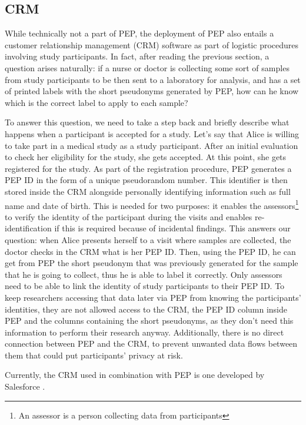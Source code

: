 \documentclass{report}
\begin{document}
\subsection{CRM}\label{CRM}
While technically not a part of PEP, the deployment of PEP also entails a customer relationship management (CRM) software as part of logistic procedures involving study participants. In 
fact, after reading the previous section, a question arises naturally: if a nurse or doctor is collecting some sort of samples from study participants to be then sent to a laboratory 
for analysis, and has a set of printed labels with the short pseudonyms generated by PEP, how can he know which is the correct label to apply to each sample? \par
To answer this question, we need to take a step back and briefly describe what happens when a participant is accepted for a study. Let's say that Alice is willing to take part in a
medical study as a study participant. After an initial evaluation to check her eligibility for the study, she gets accepted. At this point, she gets registered for the study. As
part of the registration procedure, PEP generates a PEP ID in the form of a unique pseudorandom number. This identifier is then stored inside the CRM alongside personally
identifying information such as full name and date of birth. This is needed for two purposes: it enables the assessors\footnote{An assessor is a person collecting data from
participants} to verify the identity of the participant during the visits and enables re-identification if this is required because of incidental findings. This answers our
question: when Alice presents herself to a visit where samples are collected, the doctor checks in the CRM what is her PEP ID. Then, using the PEP ID, he can get from PEP the short
pseudonym that was previously generated for the sample that he is going to collect, thus he is able to label it correctly. Only assessors need to be able to link the identity of
study participants to their PEP ID. To keep researchers accessing that data later via PEP from knowing the participants' identities, they are not allowed access to the CRM, the
PEP ID column inside PEP and the columns containing the short pseudonyms, as they don't need this information to perform their research anyway. Additionally, there is no direct
connection between PEP and the CRM, to prevent unwanted data flows between them that could put participants' privacy at risk.\par
Currently, the CRM used in combination with PEP is one developed by Salesforce \cite{salesforce-website}.
\end{document}
